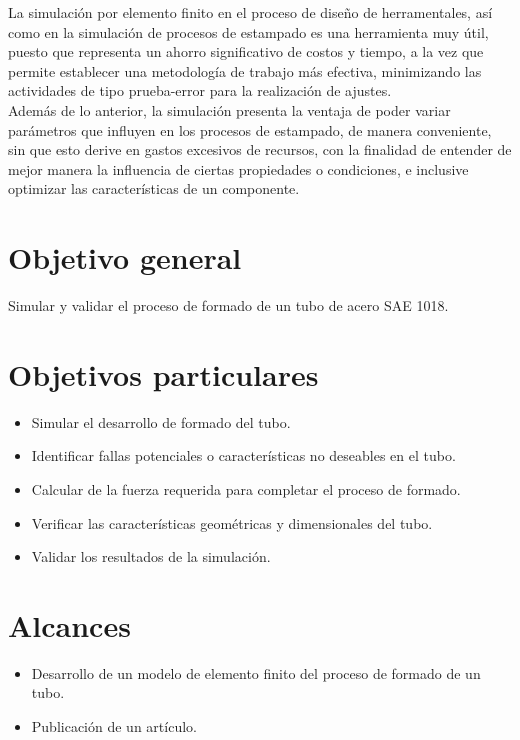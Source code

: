 La simulación por elemento finito en el proceso de diseño de herramentales, así como en 
la simulación de procesos de estampado es una herramienta muy útil, puesto que representa un ahorro 
significativo de costos y tiempo, a la vez que permite establecer una metodología de trabajo más efectiva, minimizando las 
actividades de tipo prueba-error para la realización de ajustes.\\

Además de lo anterior, la simulación presenta la ventaja de poder variar parámetros que influyen en los procesos de 
estampado, de manera conveniente, sin que esto derive en gastos excesivos de recursos, con la finalidad de entender 
de mejor manera la influencia de ciertas propiedades o condiciones, e inclusive optimizar las características 
de un componente.



\section{Objetivo general}

Simular y validar el proceso de formado de un tubo de acero SAE 1018.

\section{Objetivos particulares}
\begin{itemize}
\item Simular el desarrollo de formado del tubo.
\item Identificar fallas potenciales o características no deseables en el tubo.
\item Calcular de la fuerza requerida para completar el proceso de formado.
\item Verificar las características geométricas y dimensionales del tubo.
\item Validar los resultados de la simulación.
\end{itemize}


\section{Alcances}


\begin{itemize}
\item Desarrollo de un modelo de elemento finito del proceso de formado de un tubo.
\item Publicación de un artículo.
\end{itemize}

